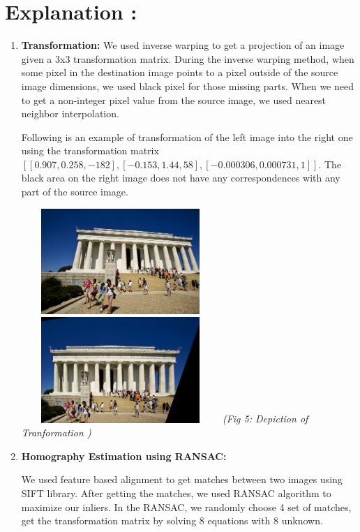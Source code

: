 \documentclass{article}
\begin{document}
			\section{Explanation : }
			\begin{enumerate}
				\item  \textbf{Transformation:}
						We used inverse warping to get a projection of an image given a 3x3 transformation matrix. During the inverse warping method, when some pixel in the destination image points to a pixel outside of the source image dimensions, we used black pixel for those missing parts. When we need to get a non-integer pixel value from the source image, we used nearest neighbor interpolation. 
						
						Following is an example of transformation of the left image into the right one using the transformation matrix $[[0.907,0.258,-182],[-0.153,1.44,58],[-0.000306,0.000731,1]]$. The black area on the right image does not have any correspondences with any part of the source image.
						
								\begin{center}
									\includegraphics[height=4cm,width=7.5cm]{21} \includegraphics[height=4cm,width=7.5cm]{212} 
									\textit{	(Fig 5: Depiction of Tranformation )}
								\end{center}
								
					\item \textbf{Homography Estimation using RANSAC:}
					
					We used feature based alignment to get matches between two images using SIFT library. After getting the matches, we used RANSAC algorithm to maximize our inliers. In the RANSAC, we randomly choose 4 set of matches, get the transformation matrix by solving 8 equations with 8 unknown. 
					

\end{enumerate}
\end{document}
